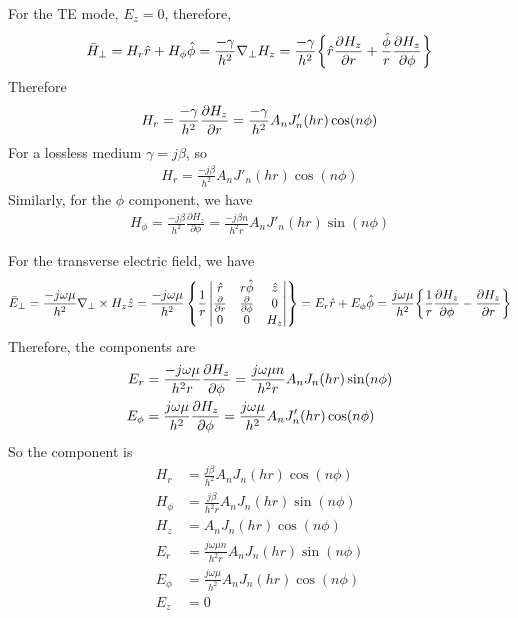 For the TE mode, $E_z = 0$, therefore,
\begin{dmath} 
\bar{H}_\perp = H_r \hat{r} + H_\phi \hat{\phi} = \frac{-\gamma}{h^2}\nabla_\perp H_z
= \frac{-\gamma}{h^2}\bigg\{ 
\hat{r}\partialderivative{H_z}{r} + \frac{\hat{\phi}}{r}\partialderivative{H_z}{\phi}  
\bigg\}
\end{dmath}
Therefore
\begin{align*}
H_r = \frac{-\gamma}{h^2}\partialderivative{H_z}{r} = \frac{-\gamma}{h^2}A_nJ'_n(hr)\cos(n\phi)
\end{align*}
For a lossless medium $ \gamma =j\beta$, so 
\begin{align*}
H_r = \frac{-j\beta}{h^2}A_nJ'_n(hr)\cos(n\phi)
\end{align*}
Similarly, for the $\phi$ component, we have
\begin{align*}
H_\phi = \frac{-j\beta}{h^2}\frac{\partial H_z}{\partial \phi} = \frac{-j\beta n}{h^2 r}A_nJ'_n(hr)\sin(n\phi)
\end{align*}

For the transverse electric field, we have
\begin{dmath} 
\bar{E}_\perp = \frac{-j\omega\mu}{h^2}\nabla_\perp\times H_z\hat{z}
=\frac{-j\omega\mu}{h^2}
\left\{ 
\frac{1}{r}
\begin{vmatrix}
\hat{r} & r\hat{\phi} & \hat{z}\\ 
\partialderivative{}{r} & \partialderivative{}{\phi} & 0\\
0 & 0 & H_z
\end{vmatrix}
\right\}
= E_r\hat{r} + E_\phi\hat{\phi}
= \frac{j\omega\mu}{h^2} \bigg\{\frac{1}{r}\partialderivative{H_z}{\phi} - \partialderivative{H_z}{r}\bigg\}
\end{dmath}
Therefore, the components are
\begin{align*}
E_r &= \frac{-j\omega\mu}{h^2 r}\partialderivative{H_z}{\phi} = \frac{j\omega\mu n}{h^2 r}A_nJ_n(hr)\sin(n\phi)\\
E_\phi &= \frac{j\omega\mu}{h^2 }\partialderivative{H_z}{\phi} = \frac{j\omega\mu }{h^2 }A_nJ'_n(hr)\cos(n\phi)
\end{align*}
So the component is
\begin{align}
H_r &= \frac{j\beta}{h^2 }A_nJ_n(hr)\cos(n\phi)\\ H_\phi &= \frac{j\beta}{h^2 r}A_nJ_n(hr)\sin(n\phi)\\
H_z &= A_nJ_n(hr)\cos(n\phi)\\
E_r &= \frac{j\omega\mu n}{h^2 r}A_nJ_n(hr)\sin(n\phi)\\
E_\phi &= \frac{j\omega\mu }{h^2 }A_nJ_n(hr)\cos(n\phi)\\
E_z & = 0
\end{align}

